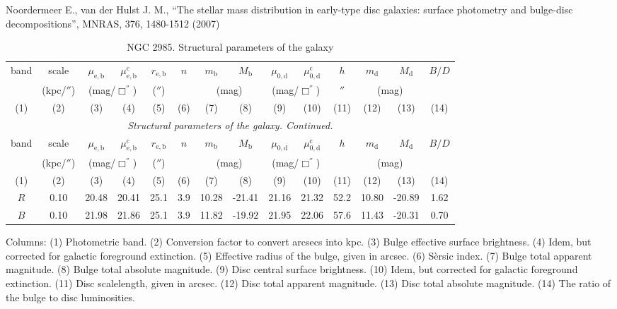 \documentclass[english,10pt]{article}
\def\mm{\mathrm}
\begin{document}
\noindent
Noordermeer E., van der Hulst J. M., 
``The stellar mass distribution in early-type disc galaxies: surface
photometry and bulge-disc decompositions'', 
MNRAS, 376, 1480-1512 (2007)

\begin{longtable}[c]{cccccccccccccc}
\caption{NGC 2985. Structural parameters of the galaxy} \\ 
\hline 
band & scale & 
$\mu_\mm{e,b}$ & $\mu_\mm{e,b}^\mm{c}$ & $r_\mm{e,b}$ & 
$n$ & $m_\mm{b}$ & $M_\mm{b}$ & 
$\mu_\mm{0,d}$ & $\mu_\mm{0,d}^\mm{c}$ & $h$ & 
$m_\mm{d}$ & $M_\mm{d}$ & $B/D$ \\ 
& (kpc/$''$) & \multicolumn{2}{c}{(mag/$\Box^{''}$)} & ($''$) 
& & \multicolumn{2}{c}{(mag)} & 
\multicolumn{2}{c}{(mag/$\Box^{''}$)} & $''$ & 
\multicolumn{2}{c}{(mag)} & \\
(1)&(2)&(3)&(4)&(5)&(6)&(7)&(8)&(9)&(10)&(11)&(12)&(13)&(14) \\ 
\hline
\endfirsthead 
\hline
\multicolumn{14}{c}{\small\slshape Structural parameters of the galaxy. 
Continued. } \\ \hline
band & scale & 
$\mu_\mm{e,b}$ & $\mu_\mm{e,b}^\mm{c}$ & $r_\mm{e,b}$ & 
$n$ & $m_\mm{b}$ & $M_\mm{b}$ & 
$\mu_\mm{0,d}$ & $\mu_\mm{0,d}^\mm{c}$ & $h$ & 
$m_\mm{d}$ & $M_\mm{d}$ & $B/D$ \\ 
& (kpc/$''$) & \multicolumn{2}{c}{(mag/$\Box^{''}$)} & ($''$) 
& & \multicolumn{2}{c}{(mag)} & 
\multicolumn{2}{c}{(mag/$\Box^{''}$)} & & 
\multicolumn{2}{c}{(mag)} & \\
(1)&(2)&(3)&(4)&(5)&(6)&(7)&(8)&(9)&(10)&(11)&(12)&(13)&(14) \\
\hline
\endhead 
\hline
$R$ & 0.10 & 20.48 & 20.41 & 25.1 & 3.9 & 10.28 & -21.41 & 
21.16 & 21.32 & 52.2 & 10.80 & -20.89 & 1.62 \tabularnewline

$B$ & 0.10 & 21.98 & 21.86 & 25.1 & 3.9 & 11.82 & -19.92 & 
21.95 & 22.06 & 57.6 & 11.43 & -20.31 & 0.70 \tabularnewline
\hline
\end{longtable}

Columns: 
(1) Photometric band. 
(2) Conversion factor to convert arcsecs into kpc.
(3) Bulge effective surface brightness. 
(4) Idem, but corrected for galactic foreground extinction.
(5) Effective radius of the bulge, given in arcsec.
(6) S\`ersic index. 
(7) Bulge total apparent magnitude.
(8) Bulge total absolute magnitude.
(9) Disc central surface brightness. 
(10) Idem, but corrected for galactic foreground extinction.
(11) Disc scalelength, given in arcsec.
(12) Disc total apparent magnitude.
(13) Disc total absolute magnitude. 
(14) The ratio of the bulge to disc luminosities. 
\end{document}
